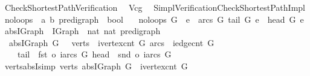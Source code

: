 %
\begin{isabellebody}%
\def\isabellecontext{Check{\isacharunderscore}Shortest{\isacharunderscore}Path{\isacharunderscore}Verification}%
%
\isadelimtheory
%
\endisadelimtheory
%
\isatagtheory
{}\isamarkupfalse%
\ Check{\isacharunderscore}Shortest{\isacharunderscore}Path{\isacharunderscore}Verification\isanewline
{}\isanewline
\ \ {\isachardoublequoteopen}Vcg{\isachardoublequoteclose}\isanewline
\ \ {\isachardoublequoteopen}{\isachardot}{\isachardot}{\isacharslash}Simpl{\isacharunderscore}Verification{\isacharslash}Check{\isacharunderscore}Shortest{\isacharunderscore}Path{\isacharunderscore}Impl{\isachardoublequoteclose}\isanewline
\isanewline
{}%
\endisatagtheory
{\isafoldtheory}%
%
\isadelimtheory
\isanewline
%
\endisadelimtheory
\isanewline
{}\isamarkupfalse%
\ no{\isacharunderscore}loops\ {\isacharcolon}{\isacharcolon}\ {\isachardoublequoteopen}{\isacharparenleft}{\isacharprime}a{\isacharcomma}\ {\isacharprime}b{\isacharparenright}\ pre{\isacharunderscore}digraph\ {\isasymRightarrow}\ bool{\isachardoublequoteclose}\ \isanewline
\ \ {\isachardoublequoteopen}no{\isacharunderscore}loops\ G\ {\isasymequiv}\ {\isasymforall}e\ {\isasymin}\ arcs\ G{\isachardot}\ tail\ G\ e\ {\isasymnoteq}\ head\ G\ e{\isachardoublequoteclose}\isanewline
\isanewline
{}\isamarkupfalse%
\ abs{\isacharunderscore}IGraph\ {\isacharcolon}{\isacharcolon}\ {\isachardoublequoteopen}IGraph\ {\isasymRightarrow}\ {\isacharparenleft}nat{\isacharcomma}\ nat{\isacharparenright}\ pre{\isacharunderscore}digraph{\isachardoublequoteclose}\ \isanewline
\ \ {\isachardoublequoteopen}abs{\isacharunderscore}IGraph\ G\ {\isasymequiv}\ {\isasymlparr}\ verts\ {\isacharequal}\ {\isacharbraceleft}{}{\isachardot}{\isachardot}{\isacharless}ivertex{\isacharunderscore}cnt\ G{\isacharbraceright}{\isacharcomma}\ arcs\ {\isacharequal}\ {\isacharbraceleft}{}{\isachardot}{\isachardot}{\isacharless}iedge{\isacharunderscore}cnt\ G{\isacharbraceright}{\isacharcomma}\isanewline
\ \ \ \ tail\ {\isacharequal}\ fst\ o\ iarcs\ G{\isacharcomma}\ head\ {\isacharequal}\ snd\ o\ iarcs\ G\ {\isasymrparr}{\isachardoublequoteclose}\isanewline
\isanewline
{}\isamarkupfalse%
\ verts{\isacharunderscore}absI{\isacharbrackleft}simp{\isacharbrackright}{\isacharcolon}\ {\isachardoublequoteopen}verts\ {\isacharparenleft}abs{\isacharunderscore}IGraph\ G{\isacharparenright}\ {\isacharequal}\ {\isacharbraceleft}{}{\isachardot}{\isachardot}{\isacharless}ivertex{\isacharunderscore}cnt\ G{\isacharbraceright}{\isachardoublequoteclose}\isanewline

\end{isabellebody}
